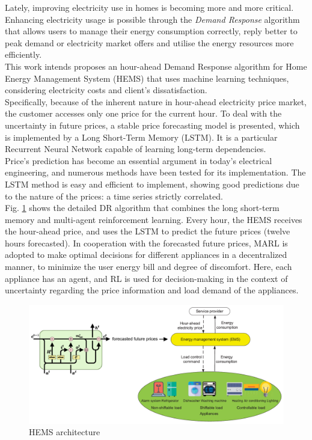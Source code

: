 Lately, improving electricity use in homes is becoming more and more critical. Enhancing electricity usage is possible through the \textit{Demand Response} algorithm that allows users to manage their energy consumption correctly, reply better to peak demand or electricity market offers and utilise the energy resources more efficiently.\\
This work intends proposes an hour-ahead Demand Response algorithm for Home Energy Management System (HEMS) that uses machine learning techniques, considering electricity costs and client's dissatisfaction. \\
Specifically, because of the inherent nature in hour-ahead electricity price market, the customer accesses only one price for the current hour. To deal with the uncertainty in future prices, a stable price forecasting model is presented, which is implemented by a Long Short-Term Memory (LSTM). It is a particular Recurrent Neural Network capable of learning long-term dependencies.\\
Price's prediction has become an essential argument in today's electrical engineering, and numerous methods have been tested for its implementation. The LSTM method is easy and efficient to implement, showing good predictions due to the nature of the prices: a time series strictly correlated. \\
Fig. \ref{fig:HEMS} shows the detailed DR algorithm that combines the long short-term memory and multi-agent reinforcement learning. Every hour, the HEMS receives the hour-ahead price, and uses the LSTM to predict the future prices (twelve hours forecasted). In cooperation with the forecasted future prices, MARL is adopted to make optimal decisions for different appliances in a decentralized manner, to minimize the user energy bill and degree of discomfort. Here, each appliance has an agent, and RL is used for decision-making in the context of uncertainty regarding the price information and load demand of the appliances.

\begin{figure}[h]
    \centering
    \includegraphics[width=\textwidth]{HEMS.png}
    \caption{HEMS architecture}
    \label{fig:HEMS}
\end{figure}